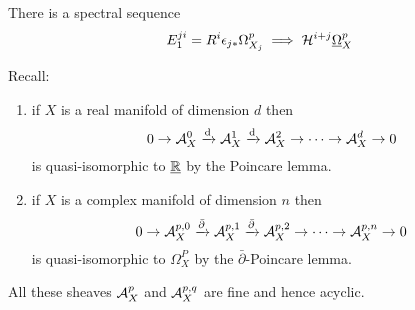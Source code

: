 \documentclass[12pt]{article}
\newcommand{\dbar}{\bar{\partial}}
\renewcommand{\cH}{\mathcal{H}}
\begin{document}
\begin{lemma}
There is a spectral sequence
\[ E_1^{ji} = R^i \epsilon_{j *} \Omega^p_{X_j} \implies \cH^{i+j} \ul{\Omega}^p_X \]
\end{lemma}

\begin{rmk}
Recall:
\begin{enumerate}
\item if $X$ is a real manifold of dimension $d$ then
\[ 0 \to \mathcal{A}_X^0 \xrightarrow{\mathrm{d}} \mathcal{A}_X^1 \xrightarrow{\mathrm{d}} \mathcal{A}_X^2 \to \cdots \to \mathcal{A}_X^d \to 0 \]
is quasi-isomorphic to $\underline{\mathbb{R}}$ by the Poincare lemma.
\item if $X$ is a complex manifold of dimension $n$ then
\[ 0 \to \cA_X^{p,0} \xrightarrow{\dbar} \cA_X^{p,1} \xrightarrow{\dbar} \cA_X^{p,2} \to \cdots \to \cA_X^{p,n} \to 0 \]
is quasi-isomorphic to $\Omega_X^P$ by the $\dbar$-Poincare lemma.
\end{enumerate}
All these sheaves $\mathcal{A}_X^p$ and $\mathcal{A}_X^{p,q}$ are fine and hence acyclic. 
\end{rmk}
\end{document}
